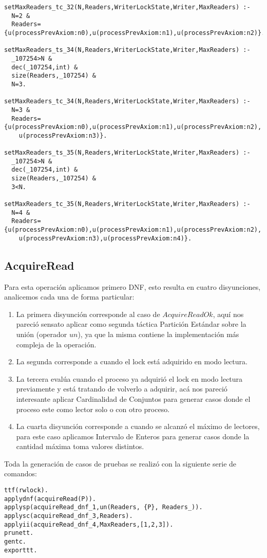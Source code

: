 \documentclass[a4paper, 12pt]{article}
\begin{document}
\begin{verbatim}
setMaxReaders_tc_32(N,Readers,WriterLockState,Writer,MaxReaders) :-
  N=2 &
  Readers={u(processPrevAxiom:n0),u(processPrevAxiom:n1),u(processPrevAxiom:n2)}.

setMaxReaders_ts_34(N,Readers,WriterLockState,Writer,MaxReaders) :-
  _107254>N &
  dec(_107254,int) &
  size(Readers,_107254) &
  N=3.

setMaxReaders_tc_34(N,Readers,WriterLockState,Writer,MaxReaders) :-
  N=3 &
  Readers={u(processPrevAxiom:n0),u(processPrevAxiom:n1),u(processPrevAxiom:n2),
    u(processPrevAxiom:n3)}.

setMaxReaders_ts_35(N,Readers,WriterLockState,Writer,MaxReaders) :-
  _107254>N &
  dec(_107254,int) &
  size(Readers,_107254) &
  3<N.

setMaxReaders_tc_35(N,Readers,WriterLockState,Writer,MaxReaders) :-
  N=4 &
  Readers={u(processPrevAxiom:n0),u(processPrevAxiom:n1),u(processPrevAxiom:n2),
    u(processPrevAxiom:n3),u(processPrevAxiom:n4)}.
\end{verbatim}
\subsection{AcquireRead}
Para esta operación aplicamos primero DNF, esto resulta en cuatro disyunciones, analicemos cada una de forma particular:
\begin{enumerate}
  \item La primera disyunción corresponde al caso de $AcquireReadOk$, aquí nos pareció sensato aplicar como segunda táctica Partición Estándar sobre la unión (operador $un$), ya que la misma contiene la implementación más compleja de la operación.
  \item La segunda corresponde a cuando el lock está adquirido en modo lectura.
  \item La tercera evalúa cuando el proceso ya adquirió el lock en modo lectura previamente y está tratando de volverlo a adquirir, acá nos pareció interesante aplicar Cardinalidad de Conjuntos para generar casos donde el proceso este como lector solo o con otro proceso.
  \item La cuarta disyunción corresponde a cuando se alcanzó el máximo de lectores, para este caso aplicamos Intervalo de Enteros para generar casos donde la cantidad máxima toma valores distintos.
\end{enumerate}

Toda la generación de casos de pruebas se realizó con la siguiente serie de comandos:
\begin{verbatim}
ttf(rwlock).
applydnf(acquireRead(P)).
applysp(acquireRead_dnf_1,un(Readers, {P}, Readers_)).
applysc(acquireRead_dnf_3,Readers).
applyii(acquireRead_dnf_4,MaxReaders,[1,2,3]).
prunett.
gentc.
exporttt.
\end{verbatim}
\end{document}
